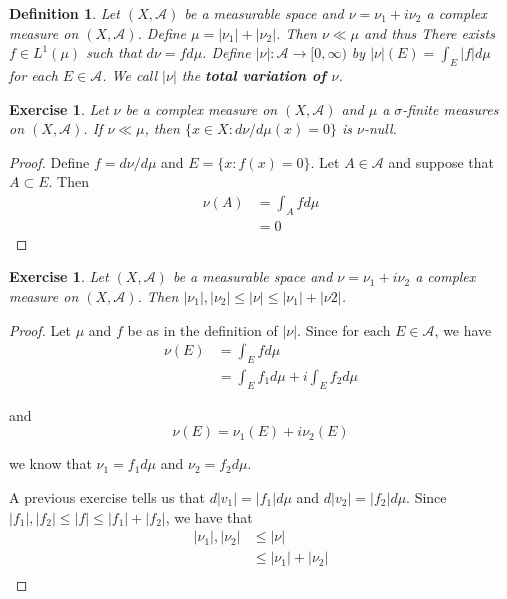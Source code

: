 \documentclass[12pt]{amsart}
\newtheorem{defn}[thm]{Definition}
\newtheorem{ex}[thm]{Exercise}
\newcommand{\sig}{\sigma}
\newcommand{\MA}{\mathcal{A}}
\newcommand{\Rg}{[0,\infty)}
\begin{document}
\begin{defn}Let $(X,\MA)$ be a measurable space and $\nu = \nu_1 + i \nu_2$ a complex measure on $(X, \MA)$. Define $\mu = |\nu_1| + |\nu_2|$. Then $\nu \ll \mu$ and thus There exists $f \in L^1(\mu)$ such that $d\nu = f d\mu$. Define $|\nu|: \MA \rightarrow \Rg$ by $|\nu|(E) = \int_E |f|d\mu$ for each $E \in \MA$. We call $|\nu|$ the \textbf{total variation of $\nu$}. 
\end{defn}

\begin{ex}
Let $\nu$ be a complex measure on $(X, \MA)$ and $\mu$ a $\sig$-finite measures on $(X,\MA)$. If $\nu \ll \mu$, then $\{x \in X: d\nu / d \mu(x) = 0 \}$ is $\nu$-null.
\end{ex}

\begin{proof}
Define $f = d\nu / d \mu$ and $E = \{x: f(x) = 0\}$. Let $A \in \MA$ and suppose that $A \subset E$. Then 
\begin{align*}
\nu(A) 
&= \int_A f d\mu\\
&= 0
\end{align*} 
\end{proof}

\begin{ex}
Let $(X, \MA)$ be a measurable space and $\nu = \nu_1 + i\nu_2$ a complex measure on $(X, \MA)$. Then $|\nu_1|, |\nu_2| \leq |\nu| \leq |\nu_1| + |\nu2|$.

\end{ex}

\begin{proof}
Let $\mu$ and $f$ be as in the definition of $|\nu|$. Since for each $E \in \MA$, we have 
\begin{align*}
\nu(E) 
&= \int_E f d\mu\\
&= \int_E f_1 d \mu + i \int_E f_2 d\mu
\end{align*}

and $$\nu(E) = \nu_1(E) + i\nu_2(E)$$

we know that $\nu_1 = f_1 d\mu$ and $\nu_2 = f_2 d \mu$. 

A previous exercise tells us that $d|v_1| = |f_1|d\mu$ and $d |v_2| = |f_2|d \mu$. Since $|f_1|, |f_2| \leq |f| \leq |f_1|+|f_2|$, we have that 
\begin{align*}
|\nu_1|, |\nu_2| 
&\leq |\nu| \\
&\leq |\nu_1| + |\nu_2|\\
\end{align*}
\end{proof}
\end{document}
